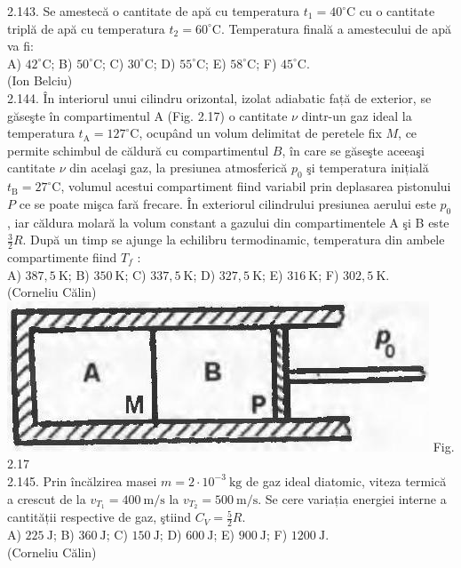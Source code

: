 2.143. Se amestecă o cantitate de apă cu temperatura $t_{1}=40^{\circ} \mathrm{C}$ cu o cantitate triplă de apă cu temperatura $t_{2}=60^{\circ} \mathrm{C}$. Temperatura finală a amestecului de apă va fi:\\ A) $42^{\circ} \mathrm{C}$; B) $50^{\circ} \mathrm{C}$; C) $30^{\circ} \mathrm{C}$; D) $55^{\circ} \mathrm{C}$; E) $58^{\circ} \mathrm{C}$; F) $45^{\circ} \mathrm{C}$.\\ (Ion Belciu)\\

2.144. În interiorul unui cilindru orizontal, izolat adiabatic față de exterior, se găseşte în compartimentul A (Fig. 2.17) o cantitate $\nu$ dintr-un gaz ideal la temperatura $t_{\mathrm{A}}=127^{\circ} \mathrm{C}$, ocupând un volum delimitat de peretele fix $M$, ce permite schimbul de căldură cu compartimentul $B$, în care se găseşte aceeaşi cantitate $\nu$ din acelaşi gaz, la presiunea atmosferică $p_{0}$ şi temperatura inițială $t_{\mathrm{B}}=27^{\circ} \mathrm{C}$, volumul acestui compartiment fiind variabil prin deplasarea pistonului $P$ ce se poate mişca fară frecare. În exteriorul cilindrului presiunea aerului este $p_{0}$, iar căldura molară la volum constant a gazului din compartimentele A şi B este $\frac{3}{2} R$. După un timp se ajunge la echilibru termodinamic, temperatura din ambele compartimente fiind $T_{f}$ :\\ A) $387,5 \mathrm{~K}$; B) $350 \mathrm{~K}$; C) $337,5 \mathrm{~K}$; D) $327,5 \mathrm{~K}$; E) $316 \mathrm{~K}$; F) $302,5 \mathrm{~K}$.\\ (Corneliu Călin)\\ \includegraphics[width=0.4\linewidth]{images/2025_07_01_5b3ff9fa0d508c8e9f17g-105} Fig. 2.17\\

2.145. Prin încălzirea masei $m=2 \cdot 10^{-3} \mathrm{~kg}$ de gaz ideal diatomic, viteza termică a crescut de la $v_{T_{1}}=400 \mathrm{~m} / \mathrm{s}$ la $v_{T_{2}}=500 \mathrm{~m} / \mathrm{s}$. Se cere variația energiei interne a cantității respective de gaz, ştiind $C_{V}=\frac{5}{2} R$.\\ A) $225 \mathrm{~J}$; B) $360 \mathrm{~J}$; C) $150 \mathrm{~J}$; D) $600 \mathrm{~J}$; E) $900 \mathrm{~J}$; F) $1200 \mathrm{~J}$.\\ (Corneliu Călin)\\

